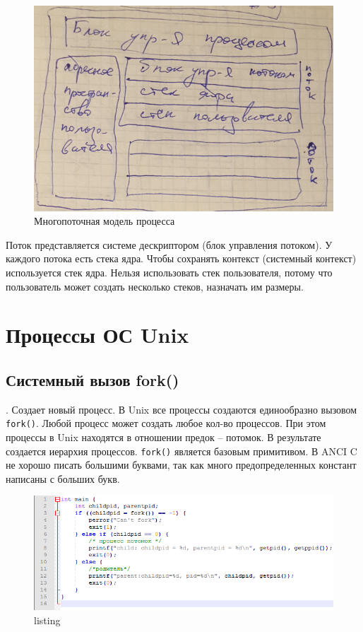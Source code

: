 \begin{figure}[H]
	\centering
	\includegraphics[width=\textwidth]{pic/1.png}
	\caption{Многопоточная модель процесса}
\end{figure}

Поток представляется системе дескриптором (блок управления потоком). У каждого потока есть стека ядра. Чтобы сохранять контекст (системный контекст) используется стек ядра. Нельзя использовать стек пользователя, потому что пользователь может создать несколько стеков, назначать им размеры. \cite{Kuznets_blesk}

\chapter{Процессы ОС Unix}

\section{Системный вызов fork()}. Создает новый процесс. В Unix все процессы создаются единообразно вызовом \verb|fork()|. Любой процесс может создать любое кол-во процессов. При этом процессы в Unix находятся в отношении предок – потомок. В результате создается иерархия процессов.  \verb|fork()| является базовым примитивом. 
В ANCI C не хорошо писать большими буквами, так как много предопределенных констант написаны с больших букв. 

\begin{figure}[H]
	\centering
	\includegraphics[width=\textwidth]{pic/2.png}
	\caption{listing}
	\label{listing:fork}
\end{figure}

